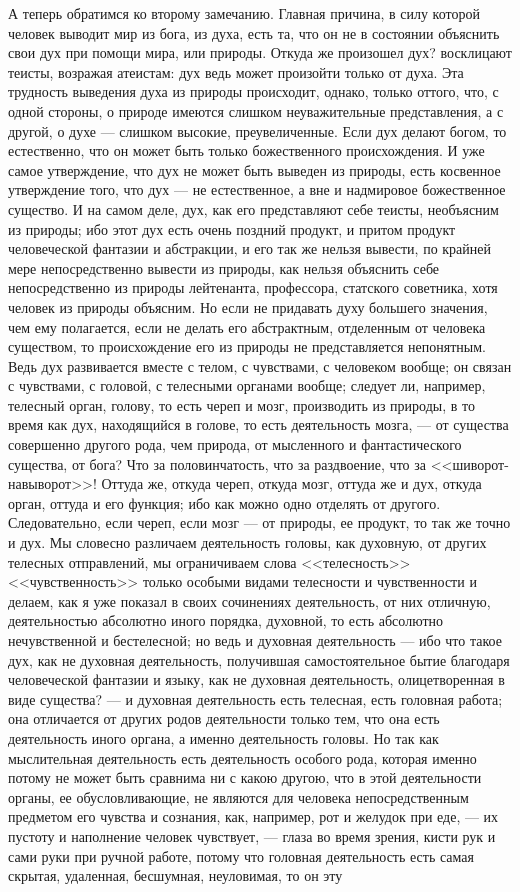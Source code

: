 \documentclass[12pt]{article}
\begin{document}
А теперь обратимся ко второму замечанию. Главная причина, в силу которой человек выводит мир из бога, из духа, есть та, что он не в состоянии объяснить свои дух при помощи мира, или природы. Откуда же произошел дух? восклицают теисты, возражая атеистам: дух ведь может произойти только от духа. Эта трудность выведения духа из природы происходит, однако, только оттого, что, с одной стороны, о природе имеются слишком неуважительные представления, а с другой, о духе --- слишком высокие, преувеличенные. Если дух делают богом, то естественно, что он может быть только божественного происхождения. И уже самое утверждение, что дух не может быть выведен из природы, есть косвенное утверждение того, что дух --- не естественное, а вне и надмировое божественное существо. И на самом деле, дух, как его представляют себе теисты, необъясним из природы; ибо этот дух есть очень поздний продукт, и притом продукт человеческой фантазии и абстракции, и его так же нельзя вывести, по крайней мере непосредственно вывести из природы, как нельзя объяснить себе непосредственно из природы лейтенанта, профессора, статского советника, хотя человек из природы объясним. Но если не придавать духу большего значения, чем ему полагается, если не делать его абстрактным, отделенным от человека существом, то происхождение его из природы не представляется непонятным. Ведь дух развивается вместе с телом, с чувствами, с человеком вообще; он связан с чувствами, с головой, с телесными органами вообще; следует ли, например, телесный орган, голову, то есть череп и мозг, производить из природы, в то время как дух, находящийся в голове, то есть деятельность мозга, --- от существа совершенно другого рода, чем природа, от мысленного и фантастического существа, от бога? Что за половинчатость, что за раздвоение, что за <<шиворот-навыворот>>! Оттуда же, откуда череп, откуда мозг, оттуда же и дух, откуда орган, оттуда и его функция; ибо как можно одно отделять от другого. Следовательно, если череп, если мозг --- от природы, ее продукт, то так же точно и дух. Мы словесно различаем деятельность головы, как духовную, от других телесных отправлений, мы ограничиваем слова <<телесность>>  <<чувственность>> только особыми видами телесности и чувственности и делаем, как я уже показал в своих сочинениях деятельность, от них отличную, деятельностью абсолютно иного порядка, духовной, то есть абсолютно нечувственной и бестелесной; но ведь и духовная деятельность --- ибо что такое дух, как не духовная деятельность, получившая самостоятельное бытие благодаря человеческой фантазии и языку, как не духовная деятельность, олицетворенная в виде существа? --- и духовная деятельность есть телесная, есть головная работа; она отличается от других родов деятельности только тем, что она есть деятельность иного органа, а именно деятельность головы. Но так как мыслительная деятельность есть деятельность особого рода, которая именно потому не может быть сравнима ни с какою другою, что в этой деятельности органы, ее обусловливающие, не являются для человека непосредственным предметом его чувства и сознания, как, например, рот и желудок при еде, --- их пустоту и наполнение человек чувствует, --- глаза во время зрения, кисти рук и сами руки при ручной работе, потому что головная деятельность есть самая скрытая, удаленная, бесшумная, неуловимая, то он эту 
\end{document}
